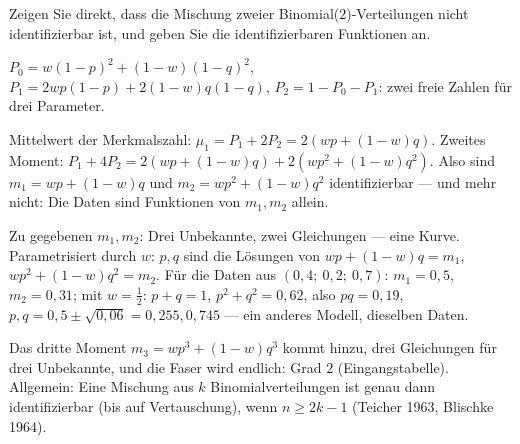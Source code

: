 \begin{aufgabe}
Zeigen Sie direkt, dass die Mischung zweier Binomial($2$)-Verteilungen nicht identifizierbar ist, und geben Sie die identifizierbaren Funktionen an.

\loesung
{}
$P_0 = w(1 - p)^{2} + (1 - w)(1 - q)^{2}$, $P_1 = 2wp(1 - p) + 2(1 - w)q(1 - q)$, $P_2 = 1 - P_0 - P_1$: zwei freie Zahlen für drei Parameter.

Mittelwert der Merkmalszahl: $\mu_1 = P_1 + 2P_2 = 2(wp + (1 - w)q)$. Zweites Moment: $P_1 + 4P_2 = 2(wp + (1-w)q) + 2(wp^{2} + (1-w)q^{2})$. Also sind $m_1 = wp + (1 - w)q$ und $m_2 = wp^{2} + (1 - w)q^{2}$ identifizierbar --- und mehr nicht: Die Daten sind Funktionen von $m_1, m_2$ allein.

Zu gegebenen $m_1, m_2$: Drei Unbekannte, zwei Gleichungen --- eine Kurve. Parametrisiert durch $w$: $p, q$ sind die Lösungen von $wp + (1-w)q = m_1$, $wp^{2} + (1-w)q^{2} = m_2$. Für die Daten aus $(0{,}4;\ 0{,}2;\ 0{,}7)$: $m_1 = 0{,}5$, $m_2 = 0{,}31$; mit $w = \tfrac12$: $p + q = 1$, $p^{2} + q^{2} = 0{,}62$, also $pq = 0{,}19$, $p, q = 0{,}5\pm\sqrt{0{,}06} = 0{,}255, 0{,}745$ --- ein anderes Modell, dieselben Daten. \checkmark

Das dritte Moment $m_3 = wp^{3} + (1-w)q^{3}$ kommt hinzu, drei Gleichungen für drei Unbekannte, und die Faser wird endlich: Grad $2$ (Eingangstabelle). Allgemein: Eine Mischung aus $k$ Binomialverteilungen ist genau dann identifizierbar (bis auf Vertauschung), wenn $n\ge2k - 1$ (Teicher 1963, Blischke 1964).

\begin{center}
\begin{minipage}{0.88\textwidth}
\end{minipage}
\end{center}
\end{aufgabe}

